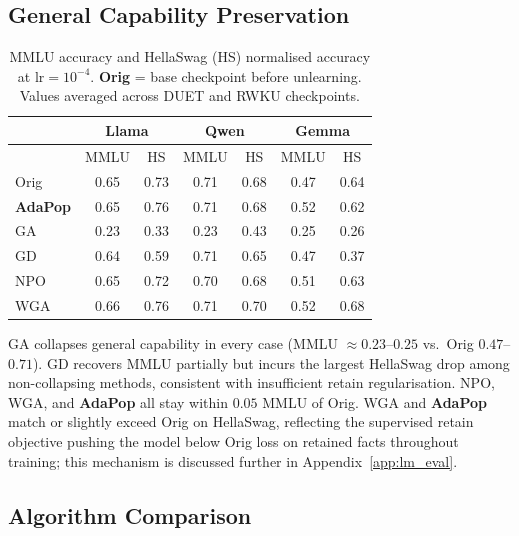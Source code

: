 \subsection{General Capability Preservation}
\label{sec:lm_eval}

\begin{table}[ht]
\centering
\footnotesize
\setlength{\tabcolsep}{3pt}
\begin{tabularx}{\linewidth}{|>{\raggedright\arraybackslash}X|c|c|c|c|c|c|}
\hline
\multirow{2}{*}{\textbf{Algo}} & \multicolumn{2}{c|}{\textbf{Llama}} & \multicolumn{2}{c|}{\textbf{Qwen}} & \multicolumn{2}{c|}{\textbf{Gemma}} \\ \cline{2-7}
 & MMLU & HS & MMLU & HS & MMLU & HS \\ \hline
Orig   & 0.65 & 0.73 & 0.71 & 0.68 & 0.47 & 0.64 \\ \hline
\rowcolor{violet!15}
\textbf{AdaPop} & 0.65 & 0.76 & 0.71 & 0.68 & 0.52 & 0.62 \\ \hline
\rowcolor{gray!10}
GA     & 0.23 & 0.33 & 0.23 & 0.43 & 0.25 & 0.26 \\ \hline
GD     & 0.64 & 0.59 & 0.71 & 0.65 & 0.47 & 0.37 \\ \hline
\rowcolor{gray!10}
NPO    & 0.65 & 0.72 & 0.70 & 0.68 & 0.51 & 0.63 \\ \hline
WGA    & 0.66 & 0.76 & 0.71 & 0.70 & 0.52 & 0.68 \\ \hline
\end{tabularx}
\caption{MMLU accuracy and HellaSwag (HS) normalised accuracy at $\text{lr}=10^{-4}$. \textbf{Orig} = base checkpoint before unlearning. Values averaged across DUET and RWKU checkpoints.}
\label{tab:lm_eval}
\end{table}

GA collapses general capability in every case (MMLU $\approx 0.23$--$0.25$ vs.\ Orig $0.47$--$0.71$). GD recovers MMLU partially but incurs the largest HellaSwag drop among non-collapsing methods, consistent with insufficient retain regularisation. NPO, WGA, and \textbf{AdaPop} all stay within $0.05$ MMLU of Orig. WGA and \textbf{AdaPop} match or slightly exceed Orig on HellaSwag, reflecting the supervised retain objective pushing the model below Orig loss on retained facts throughout training; this mechanism is discussed further in Appendix~\ref{app:lm_eval}.

\subsection{Algorithm Comparison}
\label{sec:comparison}


